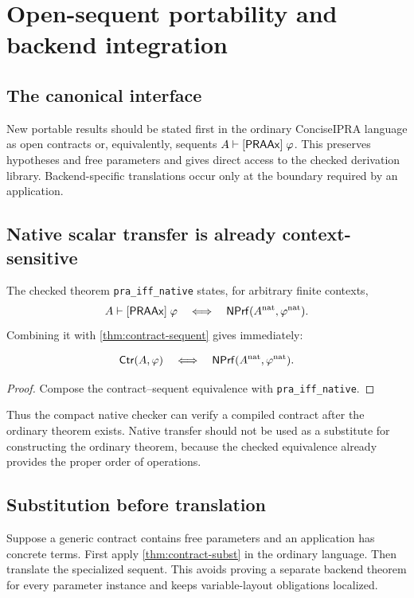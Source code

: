 \section{Open-sequent portability and backend integration}\label{sec:bridge}

\subsection{The canonical interface}

New portable results should be stated first in the ordinary ConciseIPRA language as open contracts or, equivalently, sequents \(A\mathrel{\vdash[\mathsf{PRAAx}]}\varphi\).  This preserves hypotheses and free parameters and gives direct access to the checked derivation library.  Backend-specific translations occur only at the boundary required by an application.

\subsection{Native scalar transfer is already context-sensitive}

The checked theorem \texttt{pra\_iff\_native} states, for arbitrary finite contexts,
\[
  A\mathrel{\vdash[\mathsf{PRAAx}]}\varphi
  \quad\Longleftrightarrow\quad
  \mathsf{NPrf}(A^{\mathrm{nat}},\varphi^{\mathrm{nat}}).
\]
Combining it with \cref{thm:contract-sequent} gives immediately:
\begin{theorem}\label{thm:contract-native}
\[
 \mathsf{Ctr}(A,\varphi)
 \quad\Longleftrightarrow\quad
 \mathsf{NPrf}(A^{\mathrm{nat}},\varphi^{\mathrm{nat}}).
\]
\end{theorem}

\begin{proof}
Compose the contract--sequent equivalence with \texttt{pra\_iff\_native}.
\end{proof}

Thus the compact native checker can verify a compiled contract after the ordinary theorem exists.  Native transfer should not be used as a substitute for constructing the ordinary theorem, because the checked equivalence already provides the proper order of operations.

\subsection{Substitution before translation}

Suppose a generic contract contains free parameters and an application has concrete terms.  First apply \cref{thm:contract-subst} in the ordinary language.  Then translate the specialized sequent.  This avoids proving a separate backend theorem for every parameter instance and keeps variable-layout obligations localized.

